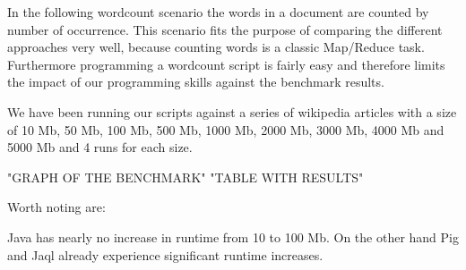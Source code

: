 In the following wordcount scenario the words in a document are counted by number of occurrence. This scenario fits the purpose of comparing the different approaches very well, because counting words is a classic Map/Reduce task. Furthermore programming a wordcount script is fairly easy and therefore limits the impact of our programming skills against the benchmark results.

We have been running our scripts against a series of wikipedia articles with a size of 10 Mb, 50 Mb, 100 Mb, 500 Mb, 1000 Mb, 2000 Mb, 3000 Mb, 4000 Mb and 5000 Mb and 4 runs for each size.

{"GRAPH OF THE BENCHMARK"}
{"TABLE WITH RESULTS"}

Worth noting are:

Java has nearly no increase in runtime from 10 to 100 Mb. On the other hand Pig and Jaql already experience significant runtime increases.